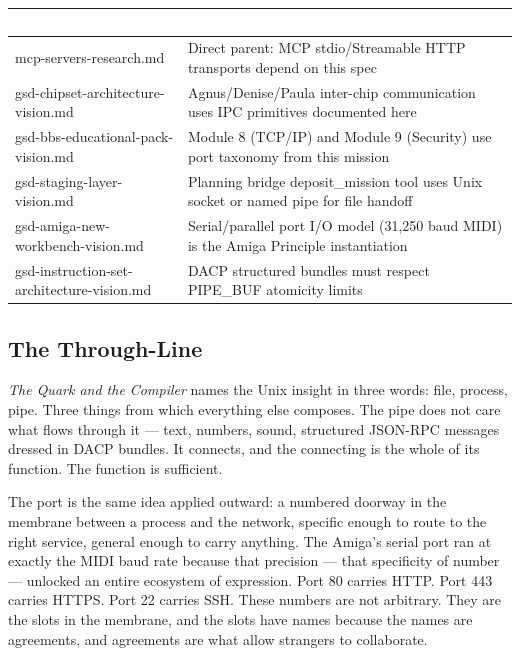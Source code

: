 \documentclass[11pt,letterpaper]{article}
\newcommand{\tableheader}[1]{\textbf{\sffamily\textcolor{white}{#1}}}
\begin{document}
\begin{center}
\begin{tabularx}{\textwidth}{L{4.5cm}X}
\toprule
{}
\tableheader{Document} & \tableheader{Relationship} \\
\midrule
mcp-servers-research.md & Direct parent: MCP stdio/Streamable HTTP transports depend on this spec \\
gsd-chipset-architecture-vision.md & Agnus/Denise/Paula inter-chip communication uses IPC primitives documented here \\
gsd-bbs-educational-pack-vision.md & Module 8 (TCP/IP) and Module 9 (Security) use port taxonomy from this mission \\
gsd-staging-layer-vision.md & Planning bridge deposit\_mission tool uses Unix socket or named pipe for file handoff \\
gsd-amiga-new-workbench-vision.md & Serial/parallel port I/O model (31,250 baud MIDI) is the Amiga Principle instantiation \\
gsd-instruction-set-architecture-vision.md & DACP structured bundles must respect PIPE\_BUF atomicity limits \\
\bottomrule
\end{tabularx}
\end{center}

\subsection{The Through-Line}

\textit{The Quark and the Compiler} names the Unix insight in three words: file, process, pipe. Three things from which everything else composes. The pipe does not care what flows through it --- text, numbers, sound, structured JSON-RPC messages dressed in DACP bundles. It connects, and the connecting is the whole of its function. The function is sufficient.

The port is the same idea applied outward: a numbered doorway in the membrane between a process and the network, specific enough to route to the right service, general enough to carry anything. The Amiga's serial port ran at exactly the MIDI baud rate because that precision --- that specificity of number --- unlocked an entire ecosystem of expression. Port 80 carries HTTP. Port 443 carries HTTPS. Port 22 carries SSH. These numbers are not arbitrary. They are the slots in the membrane, and the slots have names because the names are agreements, and agreements are what allow strangers to collaborate.
\end{document}

